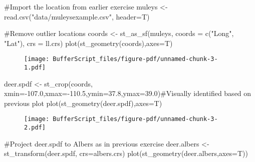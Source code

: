 \documentclass[
  letterpaper,
]{book}
\newenvironment{Shaded}{\begin{snugshade}}{\end{snugshade}}
\newcommand{\AttributeTok}[1]{\textcolor[rgb]{0.40,0.45,0.13}{#1}}
\newcommand{\CommentTok}[1]{\textcolor[rgb]{0.37,0.37,0.37}{#1}}
\newcommand{\FloatTok}[1]{\textcolor[rgb]{0.68,0.00,0.00}{#1}}
\newcommand{\FunctionTok}[1]{\textcolor[rgb]{0.28,0.35,0.67}{#1}}
\newcommand{\NormalTok}[1]{\textcolor[rgb]{0.00,0.23,0.31}{#1}}
\newcommand{\OtherTok}[1]{\textcolor[rgb]{0.00,0.23,0.31}{#1}}
\newcommand{\SpecialCharTok}[1]{\textcolor[rgb]{0.37,0.37,0.37}{#1}}
\newcommand{\StringTok}[1]{\textcolor[rgb]{0.13,0.47,0.30}{#1}}
\begin{document}
\begin{Shaded}
\begin{Highlighting}[]
\CommentTok{\#Import the location from earlier exercise}
\NormalTok{muleys }\OtherTok{\textless{}{-}}\FunctionTok{read.csv}\NormalTok{(}\StringTok{"data/muleysexample.csv"}\NormalTok{, }\AttributeTok{header=}\NormalTok{T)}

\CommentTok{\#Remove outlier locations}
\NormalTok{coords }\OtherTok{\textless{}{-}} \FunctionTok{st\_as\_sf}\NormalTok{(muleys, }\AttributeTok{coords =} \FunctionTok{c}\NormalTok{(}\StringTok{"Long"}\NormalTok{, }\StringTok{"Lat"}\NormalTok{), }\AttributeTok{crs =}\NormalTok{ ll.crs)}
\FunctionTok{plot}\NormalTok{(}\FunctionTok{st\_geometry}\NormalTok{(coords),}\AttributeTok{axes=}\NormalTok{T)}
\end{Highlighting}
\end{Shaded}

\begin{figure}[H]

{\centering \texttt{[image: BufferScript\_files/figure-pdf/unnamed-chunk-3-1.pdf]}

}

\end{figure}

\begin{Shaded}
\begin{Highlighting}[]
\NormalTok{deer.spdf }\OtherTok{\textless{}{-}} \FunctionTok{st\_crop}\NormalTok{(coords, }\AttributeTok{xmin=}\SpecialCharTok{{-}}\FloatTok{107.0}\NormalTok{,}\AttributeTok{xmax=}\SpecialCharTok{{-}}\FloatTok{110.5}\NormalTok{,}\AttributeTok{ymin=}\FloatTok{37.8}\NormalTok{,}\AttributeTok{ymax=}\FloatTok{39.0}\NormalTok{)}\CommentTok{\#Visually identified based on previous plot}
\FunctionTok{plot}\NormalTok{(}\FunctionTok{st\_geometry}\NormalTok{(deer.spdf),}\AttributeTok{axes=}\NormalTok{T)}
\end{Highlighting}
\end{Shaded}

\begin{figure}[H]

{\centering \texttt{[image: BufferScript\_files/figure-pdf/unnamed-chunk-3-2.pdf]}

}

\end{figure}

\begin{Shaded}
\begin{Highlighting}[]
\CommentTok{\#Project deer.spdf to Albers as in previous exercise}
\NormalTok{deer.albers }\OtherTok{\textless{}{-}}\FunctionTok{st\_transform}\NormalTok{(deer.spdf, }\AttributeTok{crs=}\NormalTok{albers.crs)}
\FunctionTok{plot}\NormalTok{(}\FunctionTok{st\_geometry}\NormalTok{(deer.albers,}\AttributeTok{axes=}\NormalTok{T))}
\end{Highlighting}
\end{Shaded}
\end{document}
